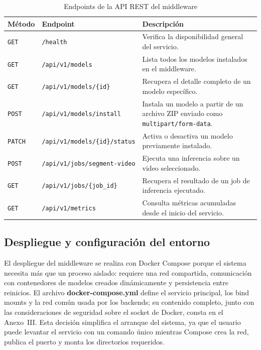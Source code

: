 \begin{table}[H]
\centering
\caption{Endpoints de la API REST del middleware}
\label{tab:endpoints_api}
\small
\renewcommand{\arraystretch}{1.18}
\setlength{\tabcolsep}{5pt}

\begin{tabular}{
    >{\centering\arraybackslash}p{1.6cm}
    >{\raggedright\arraybackslash}p{5.0cm}
    >{\raggedright\arraybackslash}p{6.7cm}
}
\toprule
\textbf{Método} & \textbf{Endpoint} & \textbf{Descripción} \\
\midrule

\texttt{GET} &
\texttt{/health} &
Verifica la disponibilidad general del servicio. \\

\texttt{GET} &
\texttt{/api/v1/models} &
Lista todos los modelos instalados en el middleware. \\

\texttt{GET} &
\texttt{/api/v1/models/\{id\}} &
Recupera el detalle completo de un modelo específico. \\

\texttt{POST} &
\texttt{/api/v1/models/install} &
Instala un modelo a partir de un archivo ZIP enviado como \texttt{multipart/form-data}. \\

\texttt{PATCH} &
\texttt{/api/v1/models/\{id\}/status} &
Activa o desactiva un modelo previamente instalado. \\

\texttt{POST} &
\texttt{/api/v1/jobs/segment-video} &
Ejecuta una inferencia sobre un video seleccionado. \\

\texttt{GET} &
\texttt{/api/v1/jobs/\{job\_id\}} &
Recupera el resultado de un job de inferencia ejecutado. \\

\texttt{GET} &
\texttt{/api/v1/metrics} &
Consulta métricas acumuladas desde el inicio del servicio. \\

\bottomrule
\end{tabular}
\end{table}

\subsection{Despliegue y configuración del entorno}

El despliegue del middleware se realiza con Docker Compose porque el sistema necesita más que un proceso aislado: requiere una red compartida, comunicación con contenedores de modelos creados dinámicamente y persistencia entre reinicios. El archivo \textbf{docker-compose.yml} define el servicio principal, los bind mounts y la red común usada por los backends; su contenido completo, junto con las consideraciones de seguridad sobre el socket de Docker, consta en el Anexo~III. Esta decisión simplifica el arranque del sistema, ya que el usuario puede levantar el servicio con un comando único mientras Compose crea la red, publica el puerto y monta los directorios requeridos.

